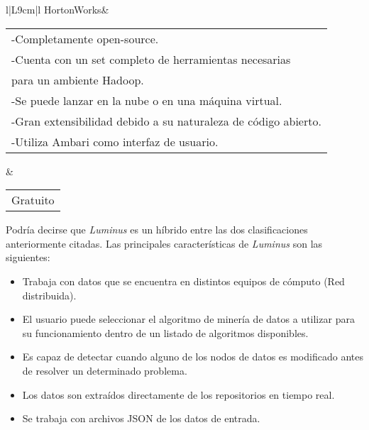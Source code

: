 \begin{itemize}
\begin{table}[H]
\begin{tabular}{l|L{9cm}|l}
		\hline
			HortonWorks& \begin{tabular}[c]{@{}l@{}}-Completamente open-source.\\ -Cuenta con un set completo de herramientas necesarias \\para un ambiente Hadoop.\\ -Se puede lanzar en la nube o en una máquina virtual.\\ -Gran extensibilidad debido a su naturaleza de código abierto.\\ -Utiliza Ambari como interfaz de usuario. \cite{infoHortonworks}\\ \end{tabular} & \begin{tabular}[c]{@{}l@{}} Gratuito \cite{precioHortonworks}\\ \end{tabular}

		\end{tabular}
	\end{table}
\end{itemize}

Podría decirse que \emph{Luminus} es un híbrido entre las dos clasificaciones anteriormente citadas. Las principales características de \emph{Luminus} son las siguientes:
\begin{itemize}	\item Trabaja con datos que se encuentra en distintos equipos de cómputo (Red distribuida).\\ 
	\item El usuario puede seleccionar el algoritmo de minería de datos a utilizar para su funcionamiento dentro de un listado de algoritmos disponibles.\\ 
	\item Es capaz de detectar cuando alguno de los nodos de datos es modificado antes de resolver un determinado problema.\\
	\item Los datos son extraídos directamente de los repositorios en tiempo real.\\
	\item Se trabaja con archivos JSON de los datos de entrada.\\ 
\end{itemize}
